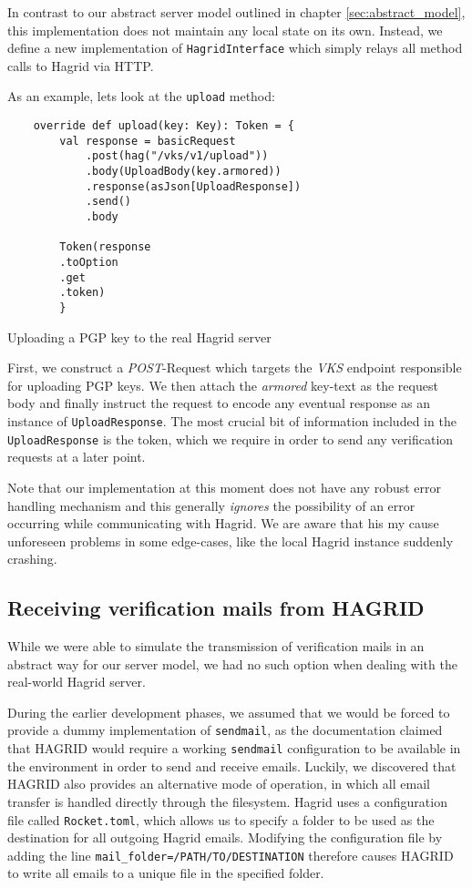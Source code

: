 In contrast to our abstract server model outlined in chapter \ref{sec:abstract_model}, this implementation does not maintain any local state on its own. Instead, we define a new implementation of \texttt{HagridInterface} which simply relays all method calls to Hagrid via HTTP.

As an example, lets look at the \texttt{upload} method: 
\begin{code}
    \begin{verbatim}
    override def upload(key: Key): Token = {
        val response = basicRequest
            .post(hag("/vks/v1/upload"))
            .body(UploadBody(key.armored))
            .response(asJson[UploadResponse])
            .send()
            .body
    
        Token(response
        .toOption
        .get
        .token)
        }
    \end{verbatim}
    \caption{Uploading a PGP key to the real Hagrid server}
\end{code}
\label{code:hagrid_upload}
First, we construct a \emph{POST}-Request which targets the \emph{VKS} endpoint responsible for uploading PGP keys. We then attach the \emph{armored} key-text as the request body and finally instruct the request to encode any eventual response as an instance of \texttt{UploadResponse}.
The most crucial bit of information included in the \texttt{UploadResponse} is the token, which we require in order to send any verification requests at a later point.

Note that our implementation at this moment does not have any robust error handling mechanism and this generally \emph{ignores} the possibility of an error occurring while communicating with Hagrid. We are aware that his my cause unforeseen problems in some edge-cases, like the local Hagrid instance suddenly crashing.

\subsection{Receiving verification mails from HAGRID}
While we were able to simulate the transmission of verification mails in an abstract way for our server model, we had no such option when dealing with the real-world Hagrid server. 

During the  earlier development phases, we assumed that we would be forced to provide a dummy implementation of \texttt{sendmail}, as the documentation claimed that HAGRID would require a working \texttt{sendmail} configuration to be available in the environment in order to send and receive emails.
Luckily, we discovered that HAGRID also provides an alternative mode of operation, in which all email transfer is handled directly through the filesystem.
Hagrid uses a configuration file called \texttt{Rocket.toml}, which allows us to specify a folder to be used as the destination for all outgoing Hagrid emails.   
Modifying the configuration file by adding the line \texttt{mail_folder=/PATH/TO/DESTINATION} therefore causes HAGRID to write all emails to a unique file in the specified folder.


